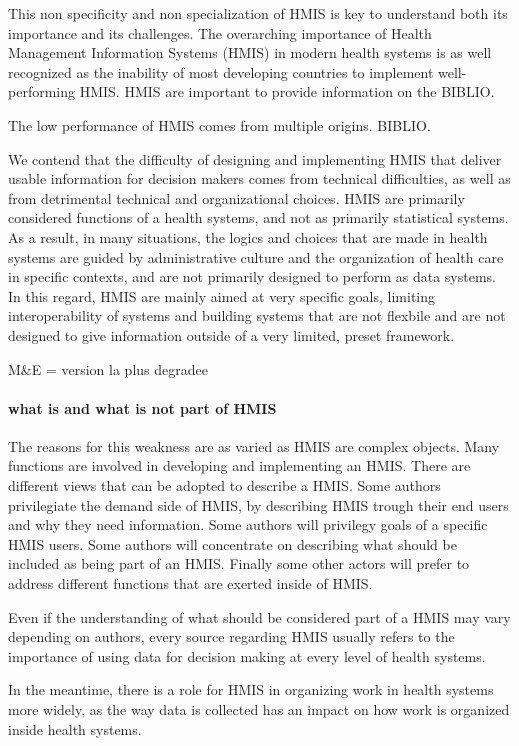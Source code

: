 \documentclass[a4paper,11pt,final,twoside]{article}
\begin{document}
This non specificity and non specialization of HMIS is key to understand both its importance and its challenges. The overarching importance of Health Management Information Systems (HMIS) in modern health systems\cite{foundph} is as well recognized as the inability of most developing countries to implement well-performing HMIS. HMIS are important to provide information on the BIBLIO.

The low performance of HMIS comes from multiple origins. BIBLIO.

We contend that the difficulty of designing and implementing HMIS that deliver usable information for decision makers comes from technical difficulties, as well as from detrimental technical and organizational choices. HMIS are primarily considered functions of a health systems, and not as primarily statistical systems. As a result, in many situations, the logics and choices that are made in health systems are guided by administrative culture and the organization of health care in specific contexts, and are not primarily designed to perform as data systems. In this regard, HMIS are mainly aimed at very specific goals, limiting interoperability of systems and building systems that are not flexbile and are not designed to give information outside of a very limited, preset framework.

M\&E = version la plus degradee

\paragraph{what is and what is not part of HMIS} The reasons for this weakness are as varied as HMIS are complex objects. Many functions are involved in developing and implementing an HMIS. There are different views that can be adopted to describe a HMIS. Some authors privilegiate the demand side of HMIS, by describing HMIS trough their end users and why they need information. Some authors will privilegy goals of a specific HMIS users. Some authors will concentrate on describing what should be included as being part of an HMIS. Finally some other actors will prefer to address different functions that are exerted inside of HMIS.

Even if the understanding of what should be considered part of a HMIS may vary depending on authors, every source regarding HMIS usually refers to the importance of using data for decision making at every level of health systems.

In the meantime, there is a role for HMIS in organizing work in health systems more widely, as the way data is collected has an impact on how work is organized inside health systems.
\end{document}
